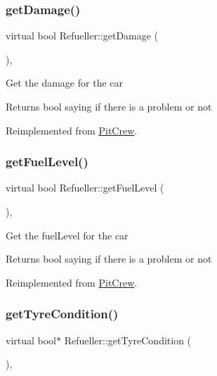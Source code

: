 \subsubsection{\texorpdfstring{get\+Damage()}{getDamage()}}
{\footnotesize\ttfamily virtual bool Refueller\+::get\+Damage (\begin{DoxyParamCaption}{ }\end{DoxyParamCaption})\hspace{0.3cm}{\ttfamily [inline]}, {\ttfamily [virtual]}}

Get the damage for the car \begin{DoxyReturn}{Returns}
bool saying if there is a problem or not 
\end{DoxyReturn}


Reimplemented from \mbox{\hyperlink{class_pit_crew_a0cd6a3161f5b016241b3a6a51d526c4f}{Pit\+Crew}}.

\mbox{\label{class_refueller_afa17784be5e98b518c3a7de2d3b7ad1f}} 
\subsubsection{\texorpdfstring{get\+Fuel\+Level()}{getFuelLevel()}}
{\footnotesize\ttfamily virtual bool Refueller\+::get\+Fuel\+Level (\begin{DoxyParamCaption}{ }\end{DoxyParamCaption})\hspace{0.3cm}{\ttfamily [inline]}, {\ttfamily [virtual]}}

Get the fuel\+Level for the car \begin{DoxyReturn}{Returns}
bool saying if there is a problem or not 
\end{DoxyReturn}


Reimplemented from \mbox{\hyperlink{class_pit_crew_a6960d91ce635df7f846301e21ae64450}{Pit\+Crew}}.

\mbox{\label{class_refueller_a4ccfe56b7f490244776856fc5b8c0d45}} 
\subsubsection{\texorpdfstring{get\+Tyre\+Condition()}{getTyreCondition()}}
{\footnotesize\ttfamily virtual bool$\ast$ Refueller\+::get\+Tyre\+Condition (\begin{DoxyParamCaption}{ }\end{DoxyParamCaption})\hspace{0.3cm}{\ttfamily [inline]}, {\ttfamily [virtual]}}


